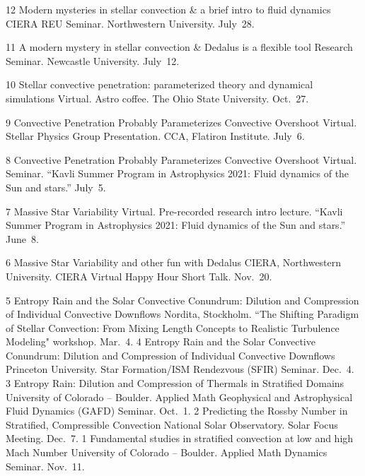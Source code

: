 \cvpub{}
      {12}
      {  
        Modern mysteries in stellar convection \& a brief intro to fluid dynamics
      }
      {
        CIERA REU Seminar. Northwestern University. July~28.
      }



\cvpub{}
      {11}
      { A modern mystery in stellar convection \& Dedalus is a flexible tool }
      {
        Research Seminar. Newcastle University. July~12.
      }

	  {10}
	  {Stellar convective penetration: parameterized theory and dynamical simulations}
	  {
	  	Virtual. Astro coffee. The Ohio State University. Oct.~27.
	  }

\cvpub{}
	  {9}
	  {Convective Penetration Probably Parameterizes Convective Overshoot}
	  {
	  	Virtual. Stellar Physics Group Presentation. CCA, Flatiron Institute. July~6.
	  }

\cvpub{}
	  {8}
	  {Convective Penetration Probably Parameterizes Convective Overshoot}
	  {
	  	Virtual. Seminar. ``Kavli Summer Program in Astrophysics 2021: Fluid dynamics of the Sun and stars.'' July~5.
	  }


\cvpub{}
	  {7}
	  {Massive Star Variability}
	  {
	  	Virtual. Pre-recorded research intro lecture. ``Kavli Summer Program in Astrophysics 2021: Fluid dynamics of the Sun and stars.'' June~8.
	  }

	  {6}
	  {Massive Star Variability and other fun with Dedalus}
	  {
	  	CIERA, Northwestern University. CIERA Virtual Happy Hour Short Talk. Nov.~20.
	  }

\cvpub{}
	  {5}
	  {Entropy Rain and the Solar Convective Conundrum: Dilution and Compression of Individual Convective Downflows}
	  {
	  	Nordita, Stockholm. ``The Shifting Paradigm of Stellar Convection: From Mixing Length Concepts to Realistic Turbulence Modeling" workshop. Mar.~4.
	  }
	  {4}
	  {Entropy Rain and the Solar Convective Conundrum: Dilution and Compression of Individual Convective Downflows}
	  {
	  	Princeton University. Star Formation/ISM Rendezvous (SFIR) Seminar. Dec.~4.
	  }
\cvpub{}
	  {3}
	  {Entropy Rain: Dilution and Compression of Thermals in Stratified Domains}
	  {
	  	University of Colorado -- Boulder. Applied Math Geophysical and Astrophysical Fluid Dynamics (GAFD) Seminar. Oct.~1.
	  }
	  {2}
	  {Predicting the Rossby Number in Stratified, Compressible Convection}
	  {
	  	National Solar Observatory. Solar Focus Meeting. Dec.~7.
	  }
      {1}
      {Fundamental studies in stratified convection at low and high Mach Number}
      {
        University of Colorado -- Boulder. Applied Math Dynamics Seminar. Nov.~11.
      }
